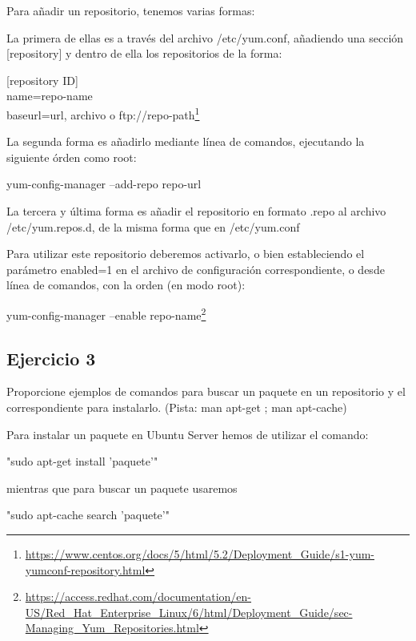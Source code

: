 \documentclass[a4paper, 11pt]{article} %
\begin{document}
Para añadir un repositorio, tenemos varias formas: 

	La primera de ellas es a través del archivo /etc/yum.conf, añadiendo una sección [repository] y dentro de ella los repositorios de la forma: 

	[repository ID]\\
	name=repo-name\\
	baseurl=url, archivo o ftp://repo-path\footnote{\url{https://www.centos.org/docs/5/html/5.2/Deployment_Guide/s1-yum-yumconf-repository.html}}
	
	La segunda forma es añadirlo mediante línea de comandos, ejecutando la siguiente órden como root: 
	
	\begin{center} yum-config-manager --add-repo repo-url \end{center}

	La tercera y última forma es añadir el repositorio en formato .repo al archivo /etc/yum.repos.d, de la misma forma que en /etc/yum.conf 
	
	Para utilizar este repositorio deberemos activarlo, o bien estableciendo el parámetro enabled=1 en el archivo de configuración correspondiente, o desde línea de comandos, con la orden (en modo root):
	
	\begin{center} yum-config-manager --enable repo-name\footnote{\url{https://access.redhat.com/documentation/en-US/Red_Hat_Enterprise_Linux/6/html/Deployment_Guide/sec-Managing_Yum_Repositories.html}} \end{center}
	

\subsection{Ejercicio 3}
Proporcione ejemplos de comandos para buscar un paquete en un
repositorio y el correspondiente para instalarlo. (Pista: man apt-get ; man apt-cache)

Para instalar un paquete en Ubuntu Server hemos de utilizar el comando: 

\begin{center} "sudo apt-get install 'paquete'" \end{center} 

mientras que para buscar un paquete usaremos 

\begin{center} "sudo apt-cache search 'paquete'" \end{center} 
\end{document}
